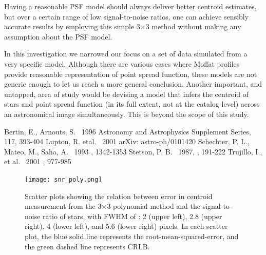 \documentclass[12pt, preprint]{aastex}
\begin{document}
Having a reasonable PSF model should always deliver better centroid estimates, but
over a certain range of low signal-to-noise ratios, one can achieve sensibly accurate
results by employing this simple 3$\times$3 method without making any assumption about
the PSF model.

In this investigation we narrowed our focus on a set of data simulated from a very specific
model. Although there are various cases where Moffat profiles provide reasonable
representation of point spread function, these models are not generic enough to let us
reach a more general conclusion. Another important, and untapped, area of study
would be devising a model that infers the centroid of stars and point spread function
(in its full extent, not at the catalog level) across an astronomical image simultaneously.
This is beyond the scope of this study. 


\begin{thebibliography}{70}

 Bertin, E., Arnouts, S. \ 1996  Astronomy and Astrophysics Supplement Series, 117, 393-404
 Lupton, R. etal. \ 2001  arXiv: astro-ph/0101420
 Schechter, P. L., Mateo, M., Saha, A. \ 1993 \pasp, 1342-1353
 Stetson, P. B. \ 1987, \pasp, 191-222
 Trujillo, I., et al. \ 2001 \mnras, 977-985

\end{thebibliography}

\clearpage


\begin{figure}[!htb]
  \texttt{[image: snr\_poly.png]}
\endminipage
\caption{Scatter plots showing the relation between error in centroid measurement from the 3$\times$3 polynomial method and the signal-to-noise ratio of stars, with FWHM of : 2 (upper left), 2.8 (upper right), 4 (lower left), and 5.6 (lower right) pixels. In each scatter plot, the blue solid line represents the root-mean-squared-error, and the green dashed line represents CRLB.}\label{1}
\end{figure}
\end{document}
